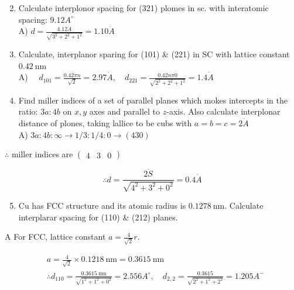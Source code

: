 \documentclass[10pt]{article}
\begin{document}
\begin{enumerate}
  \setcounter{enumi}{1}
  \item Calculate interplonor spacing for (321) plomes in sc. with interatomic spacing: $9.12 A^{\circ}$\\
A) $d=\frac{4.12 \dot{A}}{\sqrt{3^{2}+2^{2}+1^{2}}}=1.10 \dot{A}$

  \item Calculate, interplanor sparing for (101) \& (221) in SC with lattice constant $0.42 \mathrm{~nm}$\\
A) $\quad d_{101}=\frac{0.42 \pi n}{\sqrt{2}}=2.97 \dot{A}, \quad d_{221}=\frac{0.42 n \pi 0}{\sqrt{2^{2}+2^{2}+1^{2}}}=1.4 \dot{A}$

\end{enumerate}

\begin{enumerate}
  \setcounter{enumi}{3}
  \item Find miller indices of a set of parallel planes which mokes intercepts in the ratio: $3 a: 4 b$ on $x, y$ axes and parallel to $z$-axis. Also calculate interplonar distance of plones, taking lallice to be cubs with $a=b=c=2 \dot{A}$\\
A) $3 a: 4 b: \infty \longrightarrow 1 / 3: 1 / 4: 0 \rightarrow(430)$
\end{enumerate}

$\therefore$ miller indices are $\left(\begin{array}{lll}4 & 3 & 0\end{array}\right)$

$$
\therefore d=\frac{2 \dot{S}}{\sqrt{4^{2}+3^{2}+0^{2}}}=0.4 \dot{A}
$$

\begin{enumerate}
  \setcounter{enumi}{4}
  \item Cu has FCC structure and its atomic radius is $0.1278 \mathrm{~nm}$. Calculate interplarar spacing for (110) \& (212) planes.
\end{enumerate}

A For FCC, lattice constant $a=\frac{4}{\sqrt{2}} r$.

$$
\begin{aligned}
& a=\frac{4}{\sqrt{2}} \times 0.1218 \mathrm{~nm}=0.3615 \mathrm{~nm} \\
& \therefore d_{110}=\frac{0.3615 \mathrm{~nm}}{\sqrt{1^{2}+1^{2}+0^{2}}}=2.556 A^{\circ}, \quad d_{2,2}=\frac{0.3615}{\sqrt{2^{2}+1^{2}+2^{2}}}=1.205 A^{-}
\end{aligned}
$$
\end{document}
